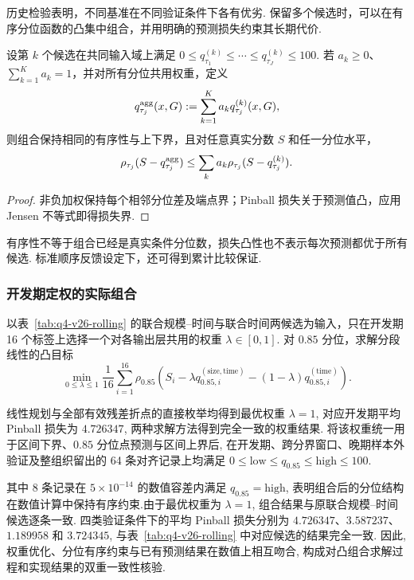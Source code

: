 历史检验表明，不同基准在不同验证条件下各有优劣. 保留多个候选时，可以在有序分位函数的凸集中组合，并用明确的预测损失约束其长期代价. 

\begin{proposition}[有序分位候选的凸组合]\label{prop:q4-convex-aggregate-v37}
设第 $k$ 个候选在共同输入域上满足
$0\le q^{(k)}_{\tau_1}\le\cdots\le q^{(k)}_{\tau_J}\le100$. 
若 $a_k\ge0$、$\sum_{k=1}^Ka_k=1$，并对所有分位共用权重，定义
\begin{equation}\label{eq:q4-convex-aggregate-v37}
q^{\rm agg}_{\tau_j}(x,G):=\sum_{k=1}^Ka_kq^{(k)}_{\tau_j}(x,G),
\end{equation}
则组合保持相同的有序性与上下界，且对任意真实分数 $S$ 和任一分位水平，
\[
\rho_{\tau_j}(S-q^{\rm agg}_{\tau_j})
\le\sum_ka_k\rho_{\tau_j}(S-q^{(k)}_{\tau_j}).
\]
\end{proposition}
\begin{proof}
非负加权保持每个相邻分位差及端点界；Pinball 损失关于预测值凸，应用 Jensen 不等式即得损失界. 
\end{proof}

有序性不等于组合已经是真实条件分位数，损失凸性也不表示每次预测都优于所有候选. 标准顺序反馈设定下，还可得到累计比较保证. 
\subsubsection{开发期定权的实际组合}\label{par:q4-aggregation-v38}
以表~\ref{tab:q4-v26-rolling} 的联合规模--时间与联合时间两候选为输入，只在开发期 16 个标签上选择一个对各输出层共用的权重 $\lambda\in[0,1]$. 对 $0.85$ 分位，求解分段线性的凸目标
\begin{equation}\label{eq:q4-aggregation-lp-v38}
\min_{0\le\lambda\le1}\frac1{16}\sum_{i=1}^{16}
\rho_{0.85}\!\left(S_i-\lambda q^{(\mathrm{size,time})}_{0.85,i}
-(1-\lambda)q^{(\mathrm{time})}_{0.85,i}\right).
\end{equation}

线性规划与全部有效残差折点的直接枚举均得到最优权重 $\lambda=1$, 对应开发期平均 Pinball 损失为 $4.726347$, 两种求解方法得到完全一致的权重结果. 将该权重统一用于区间下界、$0.85$ 分位点预测与区间上界后, 在开发期、跨分界窗口、晚期样本外验证及整组织留出的 64 条对齐记录上均满足 $0\le \mathrm{low}\le q_{0.85}\le \mathrm{high}\le100$. 

其中 8 条记录在 $5\times10^{-14}$ 的数值容差内满足 $q_{0.85}=\mathrm{high}$, 表明组合后的分位结构在数值计算中保持有序约束.由于最优权重为 $\lambda=1$, 组合结果与原联合规模--时间候选逐条一致. 四类验证条件下的平均 Pinball 损失分别为 $4.726347$、$3.587237$、$1.189958$ 和 $3.724345$, 与表~\ref{tab:q4-v26-rolling} 中对应候选的结果完全一致. 因此, 权重优化、分位有序约束与已有预测结果在数值上相互吻合, 构成对凸组合求解过程和实现结果的双重一致性核验.

